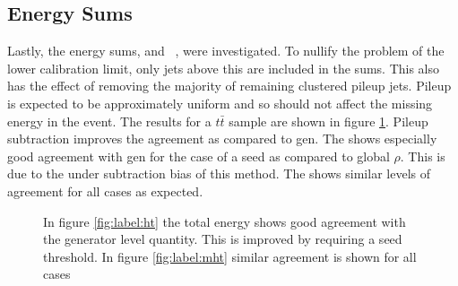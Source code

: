 \subsection{Energy Sums}
Lastly, the energy sums, \scalht and \mht~, were investigated. To nullify the problem of the lower calibration limit, only jets above this are included in the sums. This also has the effect of removing the majority of remaining clustered pileup jets. Pileup is expected to be approximately uniform and so should not affect the missing energy in the event. The results for a $t\bar{t}$ sample are shown in figure \ref{fig:label:sums}. Pileup subtraction improves the agreement as compared to gen.  The \scalht shows especially good agreement with gen for the case of a seed as compared to global $\rho$. This is due to the under subtraction bias of this method. The \mht shows similar levels of agreement for all cases as expected. 
\begin{figure}
\hfill
{}
\hfill
{}
\caption{In figure \ref{fig:label:ht} the total energy shows good agreement with the generator level quantity. This is improved by requiring a seed threshold. In figure \ref{fig:label:mht} similar agreement is shown for all cases}
\label{fig:label:sums}
\end{figure}

